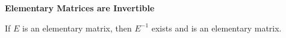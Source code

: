 \nopagenumbers
{\bf Elementary Matrices are Invertible}
\vskip 1mm

\vskip 6pt
If $E$ is an elementary matrix, then $E^{-1}$ exists and is an elementary matrix.

\vfill\eject
\bye
